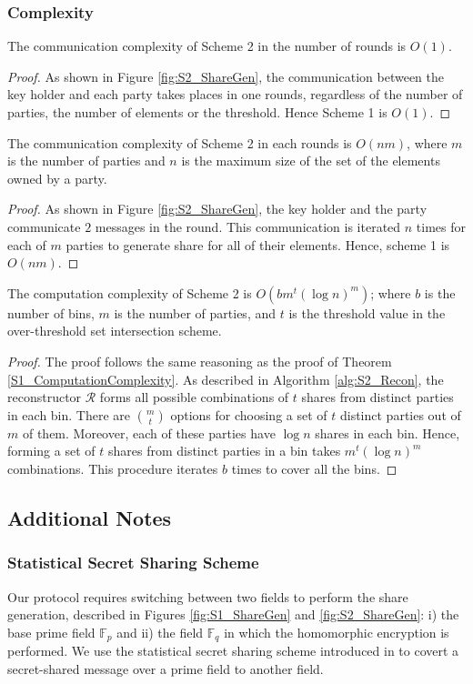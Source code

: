 \subsubsection{Complexity}
\begin{theorem}
The communication complexity of Scheme 2 in the number of rounds is $O(1)$. 
\end{theorem}
\begin{proof}
As shown in Figure \ref{fig:S2_ShareGen}, the communication between the key holder and each party takes places in one rounds, regardless of the number of parties, the number of elements or the threshold. Hence Scheme 1 is $O(1)$. 
\end{proof}
\begin{theorem}
The communication complexity of Scheme 2 in each rounds is $O(nm)$, where $m$ is the number of parties and $n$ is the maximum size of the set of the elements owned by a party. 
\end{theorem}
\begin{proof}
As shown in Figure \ref{fig:S2_ShareGen}, the key holder and the party communicate $2$ messages in the round. This communication is iterated $n$ times for each of $m$ parties to generate share for all of their elements. Hence, scheme 1 is $O(nm)$.  
\end{proof}
\begin{theorem}
The computation complexity of Scheme 2 is $O(b m^t (\log{n})^m)$; where $b$ is the number of bins, $m$ is the number of parties, and $t$ is the threshold value in the over-threshold set intersection scheme.
\end{theorem}
\begin{proof}
The proof follows the same reasoning as the proof of Theorem \ref{S1_ComputationComplexity}. 
As described in Algorithm \ref{alg:S2_Recon}, the reconstructor $\mathcal{R}$ forms all possible combinations of $t$ shares from distinct parties in each bin. There are $m \choose t$ options for choosing a set of $t$ distinct parties out of $m$ of them. Moreover, each of these parties have $\log{n}$ shares in each bin. Hence, forming a set of $t$ shares from distinct parties in a bin takes $m^t (\log{n})^m$ combinations. This procedure iterates $b$ times to cover all the bins.  
\end{proof}

\subsection{Additional Notes}
\subsubsection{Statistical Secret Sharing Scheme}
Our protocol requires switching between two fields to perform the share generation, described in Figures \ref{fig:S1_ShareGen} and \ref{fig:S2_ShareGen}: i) the base prime field $\mathbb{F}_p$ and ii) the field $\mathbb{F}_q$ in which the homomorphic encryption is performed. We use the statistical secret sharing scheme introduced in  \cite{Statistical_SSS} to covert a secret-shared message over a prime field to another field. 
